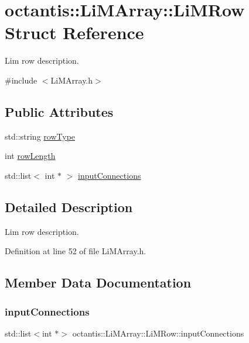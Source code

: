 \hypertarget{structoctantis_1_1LiMArray_1_1LiMRow}{}\section{octantis\+:\+:Li\+M\+Array\+:\+:Li\+M\+Row Struct Reference}
\label{structoctantis_1_1LiMArray_1_1LiMRow}


Lim row description.  




{\ttfamily \#include $<$Li\+M\+Array.\+h$>$}

\subsection*{Public Attributes}
\begin{DoxyCompactItemize}
\item 
std\+::string \hyperlink{structoctantis_1_1LiMArray_1_1LiMRow_aa35d698f2e26f6e0e66026fd2e8686a1}{row\+Type}
\item 
int \hyperlink{structoctantis_1_1LiMArray_1_1LiMRow_ac8d2c9fe6d1958d880fa4c55c57b8b29}{row\+Length}
\item 
std\+::list$<$ int $\ast$ $>$ \hyperlink{structoctantis_1_1LiMArray_1_1LiMRow_ae919d702f87bd1abf0c973d973847891}{input\+Connections}
\end{DoxyCompactItemize}


\subsection{Detailed Description}
Lim row description. 

Definition at line 52 of file Li\+M\+Array.\+h.



\subsection{Member Data Documentation}
\mbox{\label{structoctantis_1_1LiMArray_1_1LiMRow_ae919d702f87bd1abf0c973d973847891}} 
\subsubsection{\texorpdfstring{input\+Connections}{inputConnections}}
{\footnotesize\ttfamily std\+::list$<$int $\ast$$>$ octantis\+::\+Li\+M\+Array\+::\+Li\+M\+Row\+::input\+Connections}



